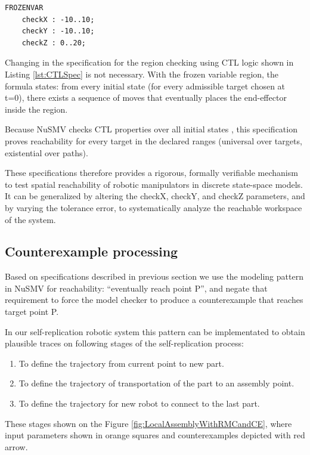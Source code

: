 \begin{lstlisting}[language=NuSMV, caption={Region definition for a reachability checking}, 
    label={lst:RegionDefinition}]
FROZENVAR
    checkX : -10..10;
    checkY : -10..10;
    checkZ : 0..20;
\end{lstlisting}

Changing in the specification for the region checking using CTL logic 
shown in Listing \ref{lst:CTLSpec} is not necessary.
With the frozen variable region, the formula states: from every initial state 
(for every admissible target chosen at t=0), there exists a sequence 
of moves that eventually places the end-effector inside the region.

Because NuSMV checks CTL properties over all initial states
, this specification proves reachability for every target in the declared 
ranges (universal over targets, existential over paths). 

These specifications therefore provides a rigorous, formally verifiable 
mechanism to test spatial reachability of robotic manipulators in 
discrete state-space models. It can be 
generalized by altering the checkX, checkY, and 
checkZ parameters, and by varying the tolerance error,
to systematically analyze the reachable workspace of the system.

\subsection{Counterexample processing}
\label{ch:Counterexample}

Based on specifications described in previous section we use 
the modeling pattern in NuSMV for reachability: “eventually reach point P”, 
and negate that requirement to force the model checker to produce a counterexample 
that reaches target point P. 

In our self-replication robotic system this pattern can be implementated to obtain 
plausible traces on following stages of the self-replication process:
\begin{enumerate}
    \item To define the trajectory from current point to new part.
    \item To define the trajectory of transportation of the part to an assembly point.
    \item To define the trajectory for new robot to connect to the last part.
\end{enumerate}

These stages shown on the Figure \ref{fig:LocalAssemblyWithRMCandCE}, where input parameters 
shown in orange squares and counterexamples depicted with red arrow.


